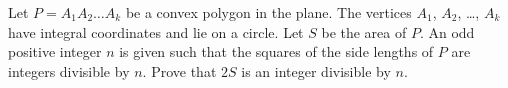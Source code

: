 Let $P=A_1A_2\dots A_k$ be a convex polygon in the plane.
The vertices $A_1$, $A_2$, \dots, $A_k$ have integral coordinates
and lie on a circle. Let $S$ be the area of $P$.
An odd positive integer $n$ is given such that
the squares of the side lengths of $P$ are integers divisible by $n$.
Prove that $2S$ is an integer divisible by $n$.